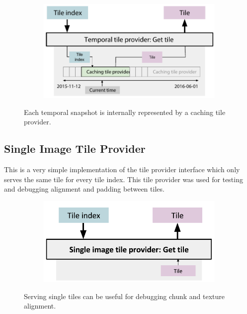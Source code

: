 \begin{figure}[htbp]
    \centering
    \begin{subfigure}[bt]{0.8\textwidth}
        \includegraphics[width=\textwidth]{figures/implementation/tileprovider/temporaltileprovider_gettile.pdf}
    \end{subfigure}
    \caption{Each temporal snapshot is internally represented by a caching tile provider.}
    \label{fig:temporaltileprovider_gettile}
\end{figure}


\subsection{Single Image Tile Provider}
This is a very simple implementation of the tile provider interface which only serves the same tile for every tile index. This tile provider was used for testing and debugging alignment and padding between tiles.

\begin{figure}[htbp]
    \centering
    \begin{subfigure}[bt]{0.6\textwidth}
        \includegraphics[width=\textwidth]{figures/implementation/tileprovider/singleimagetileprovider_gettile.pdf}
    \end{subfigure}
    \caption{Serving single tiles can be useful for debugging chunk and texture alignment.}
    \label{fig:singleimagetileprovider_gettile}
\end{figure}

